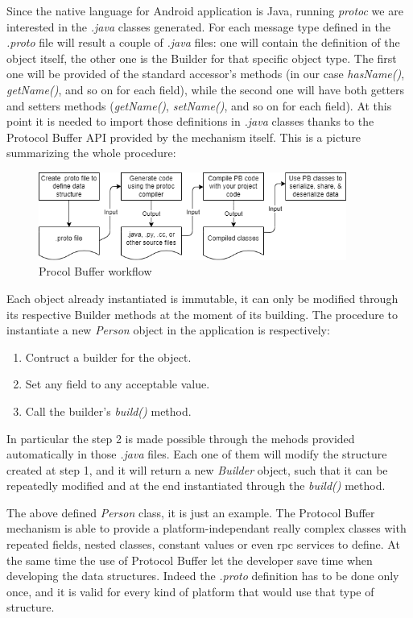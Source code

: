 		\par Since the native language for Android application is Java, running \textit{protoc} we are interested in the \textit{.java} classes generated. For each message type defined in the \textit{.proto} file will result a couple of \textit{.java} files: one will contain the definition of the object itself, the other one is the Builder for that specific object type. The first one will be provided of the standard accessor's methods (in our case \textit{hasName()}, \textit{getName()}, and so on for each field), while the second one will have both getters and setters methods (\textit{getName()}, \textit{setName()}, and so on for each field). At this point it is needed to import those definitions in \textit{.java} classes thanks to the Protocol Buffer API provided by the mechanism itself. This is a picture summarizing the whole procedure:\newline
		\begin{figure}[ht]
				\centering
				\includegraphics[width=0.9\textwidth]{images/protobuffer.png}
				\caption{Procol Buffer workflow \cite{protocol_buffer}}
		\end{figure}
		\par Each object already instantiated is immutable, it can only be modified through its respective Builder methods at the moment of its building. The procedure to instantiate a new \textit{Person} object in the application is respectively: 
		\begin{enumerate}
			\item Contruct a builder for the object. 
			\item Set any field to any acceptable value.
			\item Call the builder's \textit{build()} method.
		\end{enumerate}
		\par In particular the step 2 is made possible through the mehods provided automatically in those \textit{.java} files. Each one of them will modify the structure created at step 1, and it will return a new \textit{Builder} object, such that it can be repeatedly modified and at the end instantiated through the \textit{build()} method. \newline
		\par The above defined \textit{Person} class, it is just an example. The Protocol Buffer mechanism is able to provide a platform-independant really complex classes with repeated fields, nested classes, constant values or even rpc services to define. At the same time the use of Protocol Buffer let the developer save time  when developing the data structures. Indeed the \textit{.proto} definition has to be done only once, and it is valid for every kind of platform that would use that type of structure.
		
